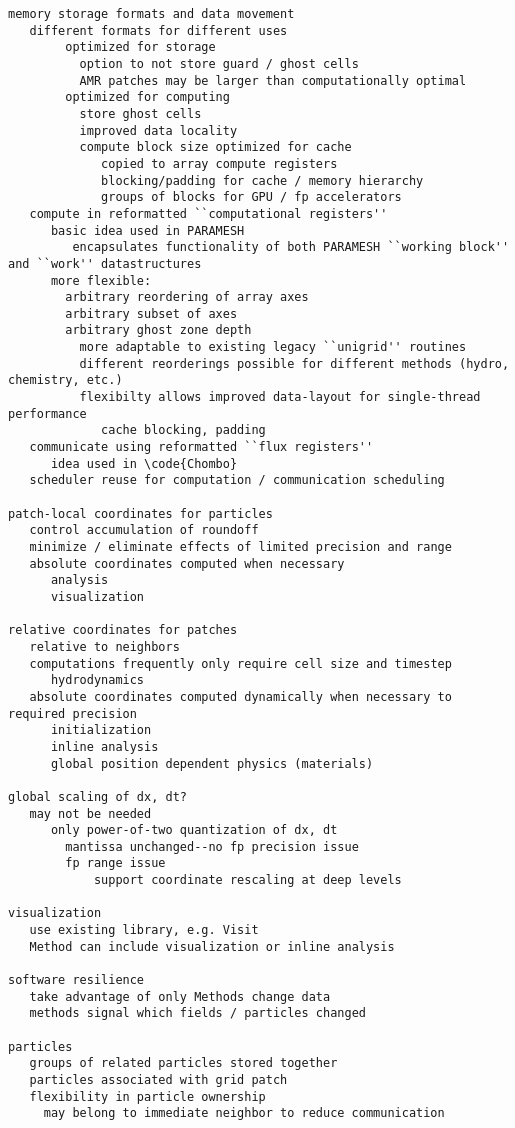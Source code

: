 \documentclass[14pt,letter]{article}
\begin{document}
\begin{verbatim}
memory storage formats and data movement
   different formats for different uses
        optimized for storage
          option to not store guard / ghost cells
          AMR patches may be larger than computationally optimal
        optimized for computing
          store ghost cells
          improved data locality
          compute block size optimized for cache
             copied to array compute registers
             blocking/padding for cache / memory hierarchy
             groups of blocks for GPU / fp accelerators
   compute in reformatted ``computational registers''
      basic idea used in PARAMESH
         encapsulates functionality of both PARAMESH ``working block'' and ``work'' datastructures
      more flexible:
        arbitrary reordering of array axes
        arbitrary subset of axes
        arbitrary ghost zone depth
          more adaptable to existing legacy ``unigrid'' routines
          different reorderings possible for different methods (hydro, chemistry, etc.)
          flexibilty allows improved data-layout for single-thread performance
             cache blocking, padding
   communicate using reformatted ``flux registers''
      idea used in \code{Chombo}
   scheduler reuse for computation / communication scheduling

patch-local coordinates for particles
   control accumulation of roundoff
   minimize / eliminate effects of limited precision and range
   absolute coordinates computed when necessary
      analysis
      visualization

relative coordinates for patches   
   relative to neighbors
   computations frequently only require cell size and timestep
      hydrodynamics
   absolute coordinates computed dynamically when necessary to required precision
      initialization
      inline analysis
      global position dependent physics (materials)

global scaling of dx, dt?
   may not be needed
      only power-of-two quantization of dx, dt
        mantissa unchanged--no fp precision issue
        fp range issue
            support coordinate rescaling at deep levels
        
visualization
   use existing library, e.g. Visit
   Method can include visualization or inline analysis

software resilience
   take advantage of only Methods change data
   methods signal which fields / particles changed

particles
   groups of related particles stored together
   particles associated with grid patch
   flexibility in particle ownership
     may belong to immediate neighbor to reduce communication



\end{verbatim}
\end{document}
